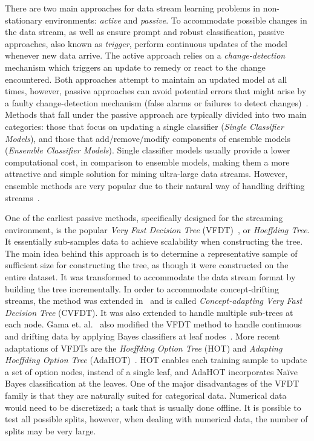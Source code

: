 \documentclass[reqno]{vcuthesis}
\numberwithin{equation}{chapter}
\begin{document}
There are two main approaches for data stream learning problems in non-stationary environments: \textit{active} and \textit{passive}. To accommodate possible changes in the data stream, as well as ensure prompt and robust classification, passive approaches, also known as \textit{trigger}, perform continuous updates of the model whenever new data arrive. The active approach relies on a \textit{change-detection} mechanism which triggers an update to remedy or react to the change encountered. Both approaches attempt to maintain an updated model at all times, however, passive approaches can avoid potential errors that might arise by a faulty change-detection mechanism (false alarms or failures to detect changes)~\cite{ditzler2015learning}. Methods that fall under the passive approach are typically divided into two main categories: those that focus on updating a single classifier (\textit{Single Classifier Models}), and those that add/remove/modify components of ensemble models (\textit{Ensemble Classifier Models}). Single classifier models usually provide a lower computational cost, in comparison to ensemble models, making them a more attractive and simple solution for mining ultra-large data streams. However, ensemble methods are very popular due to their natural way of handling drifting streams~\cite{krawczyk2017ensemble}. 

One of the earliest passive methods, specifically designed for the streaming environment, is the popular \textit{Very Fast Decision Tree} (VFDT)~\cite{domingos2000mining}, or \textit{Hoeffding Tree}. It essentially sub-samples data to achieve scalability when constructing the tree. The main idea behind this approach is to determine a representative sample of sufficient size for constructing the tree, as though it were constructed on the entire dataset. It was transformed to accommodate the data stream format by building the tree incrementally. In order to accommodate concept-drifting streams, the method was extended in~\cite{hulten2001mining} and is called \textit{Concept-adapting Very Fast Decision Tree} (CVFDT). It was also extended to handle multiple sub-trees at each node. Gama et. al.~\cite{gama2006decision} also modified the VFDT method to handle continuous and drifting data by applying Bayes classifiers at leaf nodes~\cite{aggarwal}. More recent adaptations of VFDTs are the \textit{Hoeffding Option Tree} (HOT) and \textit{Adapting Hoeffding Option Tree} (AdaHOT)~\cite{pfahringer2007new}. HOT enables each training sample to update a set of option nodes, instead of a single leaf, and AdaHOT incorporates Na\"{i}ve Bayes classification at the leaves. One of the major disadvantages of the VFDT family is that they are naturally suited for categorical data. Numerical data would need to be discretized; a task that is usually done offline. It is possible to test all possible splits, however, when dealing with numerical data, the number of splits may be very large. 
\end{document}
